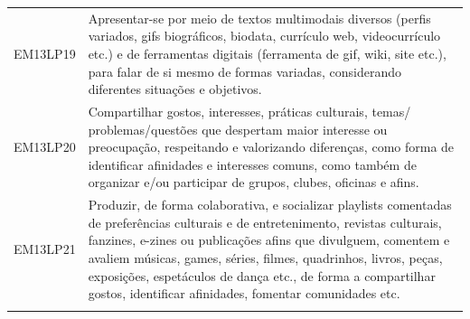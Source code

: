 \documentclass[12pt]{extarticle}
\begin{document}
\begin{longtable}{ll}
EM13LP19   & Apresentar-se por meio de textos multimodais diversos (perfis variados, gifs biográficos, biodata, currículo web, videocurrículo etc.) e de ferramentas digitais (ferramenta de gif, wiki, site etc.), para falar de si mesmo de formas variadas, considerando diferentes situações e objetivos.                                                                                                                                                                                                                                                                                                                                                                                                                                                                                                                      \\
\rowcolor[HTML]{FFF} 
EM13LP20   & Compartilhar gostos, interesses, práticas culturais, temas/ problemas/questões que despertam maior interesse ou preocupação, respeitando e valorizando diferenças, como forma de identificar afinidades e interesses comuns, como também de organizar e/ou participar de grupos, clubes, oficinas e afins.                                                                                                                                                                                                                                                                                                                                                                                                                                                                                                            \\
\rowcolor[HTML]{E0F7FA} 
EM13LP21   & Produzir, de forma colaborativa, e socializar playlists comentadas de preferências culturais e de entretenimento, revistas culturais, fanzines, e-zines ou publicações afins que divulguem, comentem e avaliem músicas, games, séries, filmes, quadrinhos, livros, peças, exposições, espetáculos de dança etc., de forma a compartilhar gostos, identificar afinidades, fomentar comunidades etc.                                                                                                                                                                                                                                                                                                                                                                                                                    \\
\rowcolor[HTML]{FFF} 

\end{longtable}
\end{document}
